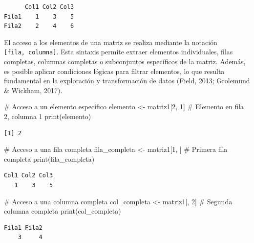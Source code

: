 \documentclass[
  spanish,
  a4paper,
  DIV=11,
  numbers=noendperiod,
  onepage,
  openany]{scrreprt}
\newenvironment{Shaded}{\begin{snugshade}}{\end{snugshade}}
\newcommand{\CommentTok}[1]{\textcolor[rgb]{0.37,0.37,0.37}{#1}}
\newcommand{\DecValTok}[1]{\textcolor[rgb]{0.68,0.00,0.00}{#1}}
\newcommand{\FunctionTok}[1]{\textcolor[rgb]{0.28,0.35,0.67}{#1}}
\newcommand{\NormalTok}[1]{\textcolor[rgb]{0.00,0.23,0.31}{#1}}
\newcommand{\OtherTok}[1]{\textcolor[rgb]{0.00,0.23,0.31}{#1}}
\begin{document}
\begin{verbatim}
      Col1 Col2 Col3
Fila1    1    3    5
Fila2    2    4    6
\end{verbatim}

El acceso a los elementos de una matriz se realiza mediante la notación
\texttt{{[}fila,\ columna{]}}. Esta sintaxis permite extraer elementos
individuales, filas completas, columnas completas o subconjuntos
específicos de la matriz. Además, es posible aplicar condiciones lógicas
para filtrar elementos, lo que resulta fundamental en la exploración y
transformación de datos (Field, 2013; Grolemund \& Wickham, 2017).

\begin{Shaded}
\begin{Highlighting}[]
\CommentTok{\# Acceso a un elemento específico}
\NormalTok{elemento }\OtherTok{\textless{}{-}}\NormalTok{ matriz1[}\DecValTok{2}\NormalTok{, }\DecValTok{1}\NormalTok{]     }\CommentTok{\# Elemento en fila 2, columna 1}
\FunctionTok{print}\NormalTok{(elemento)}
\end{Highlighting}
\end{Shaded}

\begin{verbatim}
[1] 2
\end{verbatim}

\begin{Shaded}
\begin{Highlighting}[]
\CommentTok{\# Acceso a una fila completa}
\NormalTok{fila\_completa }\OtherTok{\textless{}{-}}\NormalTok{ matriz1[}\DecValTok{1}\NormalTok{, ] }\CommentTok{\# Primera fila completa}
\FunctionTok{print}\NormalTok{(fila\_completa)}
\end{Highlighting}
\end{Shaded}

\begin{verbatim}
Col1 Col2 Col3 
   1    3    5 
\end{verbatim}

\begin{Shaded}
\begin{Highlighting}[]
\CommentTok{\# Acceso a una columna completa}
\NormalTok{col\_completa }\OtherTok{\textless{}{-}}\NormalTok{ matriz1[, }\DecValTok{2}\NormalTok{]  }\CommentTok{\# Segunda columna completa}
\FunctionTok{print}\NormalTok{(col\_completa)}
\end{Highlighting}
\end{Shaded}

\begin{verbatim}
Fila1 Fila2 
    3     4 
\end{verbatim}
\end{document}
